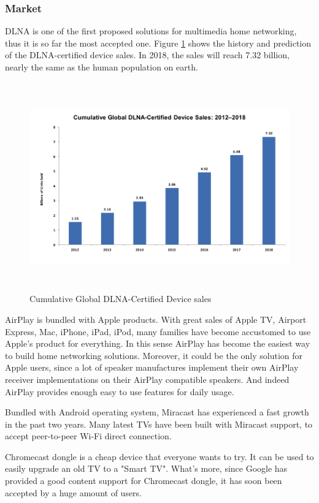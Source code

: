 \subsubsection{Market\label{2_3_2}} 
DLNA is one of the first proposed solutions for multimedia home 
networking, thus it is so far the most accepted one. Figure 
\ref{dlna_market} shows the history and prediction of the DLNA-certified device sales. In 2018, the 
sales will reach 7.32 billion, nearly the same as the human population on earth.

\begin{figure}[htb] 
\centering \includegraphics[height=9cm]{charts/dlna_market} 
\caption{Cumulative Global DLNA-Certified Device sales \label{dlna_market}} 
\end{figure}
 
AirPlay is bundled with Apple products. With great sales of Apple TV, Airport Express, 
Mac, iPhone, iPad, iPod, many families have become accustomed to use Apple's
product for everything. In this sense AirPlay has become the easiest way to
build home networking solutions. Moreover, it could be the only solution for
Apple users, since a lot of speaker manufactures implement their own AirPlay
receiver implementations on their AirPlay compatible speakers. And indeed
AirPlay provides enough easy to use features for daily usage.

Bundled with Android operating system, Miracast has experienced a fast growth in 
the past two years. Many latest TVs have been built with Miracast support, to accept peer-to-peer Wi-Fi direct connection.

Chromecast dongle is a cheap device that everyone wants to try. It can be used
to easily upgrade an old TV to a "Smart TV".  What's more, since Google has
provided a good content support for Chromecast dongle, it has soon been accepted
by a huge amount of users.

